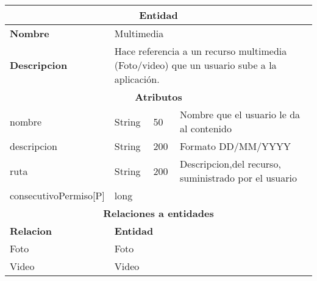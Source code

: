 \begin{table}[h]
\begin{tabular}{|l|l|l|l|l|}
\hline
\multicolumn{5}{|c|}{\cellcolor[HTML]{9BC2E6}\textbf{Entidad}}                                                                                      \\ \hline
\textbf{Nombre}             & \multicolumn{4}{l|}{Multimedia}                                                                                       \\ \hline
\textbf{Descripcion}        & \multicolumn{4}{l|}{Hace referencia a un recurso multimedia (Foto/video) que un usuario sube a la aplicación.}        \\ \hline
\multicolumn{5}{|c|}{\textbf{Atributos}}                                                                                                            \\ \hline
\multicolumn{2}{|l|}{nombre}                    & String           & 50            & Nombre que el usuario le da al contenido                       \\ \hline
\multicolumn{2}{|l|}{descripcion}               & String           & 200           & Formato DD/MM/YYYY                                             \\ \hline
\multicolumn{2}{|l|}{ruta}                      & String           & 200           & Descripcion,del recurso, suministrado por el usuario           \\ \hline
\multicolumn{2}{|l|}{consecutivoPermiso{[}P{]}} & long             &               &                                                                \\ \hline
\multicolumn{5}{|c|}{\textbf{Relaciones a entidades}}                                                                                               \\ \hline
\multicolumn{2}{|l|}{\textbf{Relacion}}         & \multicolumn{3}{l|}{\textbf{Entidad}}                                                             \\ \hline
\multicolumn{2}{|l|}{Foto}                      & \multicolumn{3}{l|}{Foto}                                                                         \\ \hline
\multicolumn{2}{|l|}{Video}                     & \multicolumn{3}{l|}{Video}                                                                        \\ \hline
\end{tabular}
\end{table}